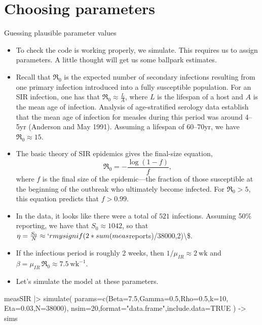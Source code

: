 \documentclass[
  ignorenonframetext,
  aspectratio=169,
  t]{beamer}
\newenvironment{Shaded}{\begin{snugshade}}{\end{snugshade}}
\newcommand{\AttributeTok}[1]{\textcolor[rgb]{0.40,0.45,0.13}{#1}}
\newcommand{\ConstantTok}[1]{\textcolor[rgb]{0.56,0.35,0.01}{#1}}
\newcommand{\DecValTok}[1]{\textcolor[rgb]{0.68,0.00,0.00}{#1}}
\newcommand{\FloatTok}[1]{\textcolor[rgb]{0.68,0.00,0.00}{#1}}
\newcommand{\FunctionTok}[1]{\textcolor[rgb]{0.28,0.35,0.67}{#1}}
\newcommand{\NormalTok}[1]{\textcolor[rgb]{0.00,0.23,0.31}{#1}}
\newcommand{\OtherTok}[1]{\textcolor[rgb]{0.00,0.23,0.31}{#1}}
\newcommand{\SpecialCharTok}[1]{\textcolor[rgb]{0.37,0.37,0.37}{#1}}
\newcommand{\StringTok}[1]{\textcolor[rgb]{0.13,0.47,0.30}{#1}}
\theoremstyle{definition}
\newcommand\Rzero{\mathfrak{R}_0}
\begin{document}
\section{Choosing parameters}\label{choosing-parameters}

\begin{frame}{Guessing plausible parameter
values}
\label{guessing-plausible-parameter-values}
\begin{itemize}
\item
  To check the code is working properly, we simulate. This requires us
  to assign parameters. A little thought will get us some ballpark
  estimates.
\item
  Recall that \(\Rzero\) is the expected number of secondary infections
  resulting from one primary infection introduced into a fully
  susceptible population. For an SIR infection, one has that
  \(\Rzero\approx\frac{L}{A}\), where \(L\) is the lifespan of a host
  and \(A\) is the mean age of infection. Analysis of age-stratified
  serology data establish that the mean age of infection for measles
  during this period was around 4--5yr (Anderson and May 1991). Assuming
  a lifespan of 60--70yr, we have \(\Rzero\approx 15\).
\item
  The basic theory of SIR epidemics gives the final-size equation,
  \[\Rzero = -\frac{\log{(1-f)}}{f},\] where \(f\) is the final size of
  the epidemic---the fraction of those susceptible at the beginning of
  the outbreak who ultimately become infected. For \(\Rzero>5\), this
  equation predicts that \(f>0.99\).
\item
  In the data, it looks like there were a total of \(521\) infections.
  Assuming 50\% reporting, we have that \(S_0\approx1042\), so that
  \(\eta=\frac{S_0}{N}\approx`r mysignif(2*sum(meas\)reports)/38000,2)\textbackslash\$.
\item
  If the infectious period is roughly 2 weeks, then
  \(1/\mu_{IR} \approx 2~\text{wk}\) and
  \(\beta = \mu_{IR}\,\Rzero \approx 7.5~\text{wk}^{-1}\).
\item
  Let's simulate the model at these parameters.
\end{itemize}

\begin{Shaded}
\begin{Highlighting}[]
\NormalTok{    measSIR }\SpecialCharTok{|\textgreater{}}
      \FunctionTok{simulate}\NormalTok{(}
        \AttributeTok{params=}\FunctionTok{c}\NormalTok{(}\AttributeTok{Beta=}\FloatTok{7.5}\NormalTok{,}\AttributeTok{Gamma=}\FloatTok{0.5}\NormalTok{,}\AttributeTok{Rho=}\FloatTok{0.5}\NormalTok{,}\AttributeTok{k=}\DecValTok{10}\NormalTok{, }\AttributeTok{Eta=}\FloatTok{0.03}\NormalTok{,}\AttributeTok{N=}\DecValTok{38000}\NormalTok{),}
        \AttributeTok{nsim=}\DecValTok{20}\NormalTok{,}\AttributeTok{format=}\StringTok{"data.frame"}\NormalTok{,}\AttributeTok{include.data=}\ConstantTok{TRUE}
\NormalTok{      ) }\OtherTok{{-}\textgreater{}}\NormalTok{ sims}


\end{Highlighting}
\end{Shaded}
\end{frame}
\end{document}
